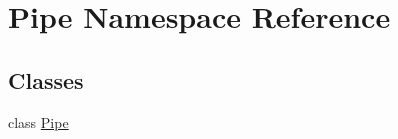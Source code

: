 \hypertarget{namespace_pipe}{}\section{Pipe Namespace Reference}
\label{namespace_pipe}
\subsection*{Classes}
\begin{DoxyCompactItemize}
\item 
class \hyperlink{class_pipe_1_1_pipe}{Pipe}
\end{DoxyCompactItemize}
